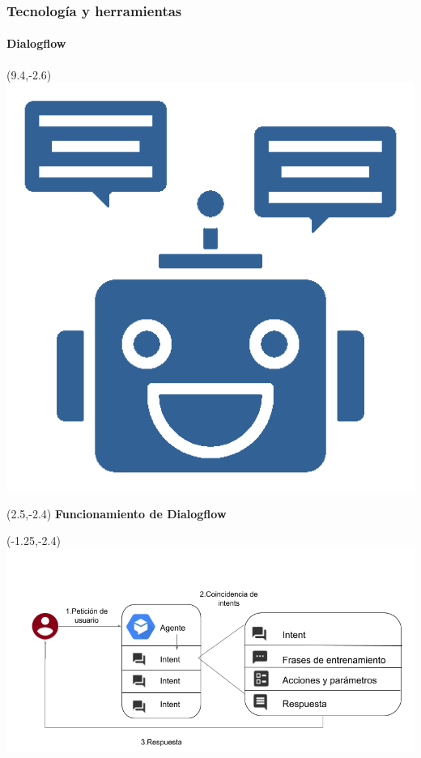 \documentclass[10pt]{beamer}
\begin{document}
\begin{frame}
\frametitle{Tecnología y herramientas}
\framesubtitle{Dialogflow}
\begin{textblock}{1.5}(9.4,-2.6)
	\includegraphics[width = 1\textwidth]{Figuras/robotico.png}
\end{textblock}
\begin{textblock}{15}(2.5,-2.4)
	\large \textbf{\textcolor{pantone}{Funcionamiento de Dialogflow}}
\end{textblock}

\begin{textblock}{13}(-1.25,-2.4)
	\includegraphics[width =1\textwidth]{Figuras/FlujoCoincidencias.png}
\end{textblock}
\end{frame}
\end{document}
